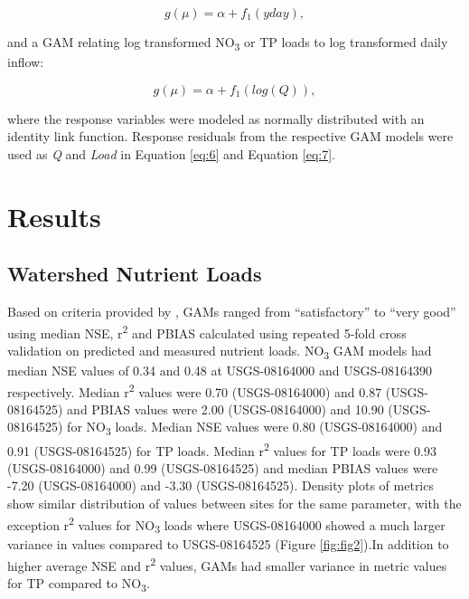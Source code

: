 \documentclass[water,article,submit,oneauthor]{Definitions/mdpi}
\begin{document}
\begin{equation}\label{eq:8}
g(\mu) = \alpha + f_1(yday),
\end{equation}

and a GAM relating log transformed NO\textsubscript{3} or TP loads to
log transformed daily inflow:

\begin{equation}\label{eq:9}
g(\mu) = \alpha + f_1(log(Q)),
\end{equation}

where the response variables were modeled as normally distributed with
an identity link function. Response residuals from the respective GAM
models were used as \emph{Q} and \emph{Load} in Equation \ref{eq:6} and
Equation \ref{eq:7}.

\hypertarget{results}{%
\section{Results}\label{results}}

\hypertarget{watershed-nutrient-loads}{%
\subsection{Watershed Nutrient Loads}\label{watershed-nutrient-loads}}

Based on criteria provided by \citet{moriasiHydrologicWaterQuality2015},
GAMs ranged from ``satisfactory'' to ``very good'' using median NSE,
r\textsuperscript{2} and PBIAS calculated using repeated 5-fold cross
validation on predicted and measured nutrient loads. NO\textsubscript{3}
GAM models had median NSE values of 0.34 and 0.48 at USGS-08164000 and
USGS-08164390 respectively. Median r\textsuperscript{2} values were 0.70
(USGS-08164000) and 0.87 (USGS-08164525) and PBIAS values were 2.00
(USGS-08164000) and 10.90 (USGS-08164525) for NO\textsubscript{3} loads.
Median NSE values were 0.80 (USGS-08164000) and 0.91 (USGS-08164525) for
TP loads. Median r\textsuperscript{2} values for TP loads were 0.93
(USGS-08164000) and 0.99 (USGS-08164525) and median PBIAS values were
-7.20 (USGS-08164000) and -3.30 (USGS-08164525). Density plots of
metrics show similar distribution of values between sites for the same
parameter, with the exception r\textsuperscript{2} values for
NO\textsubscript{3} loads where USGS-08164000 showed a much larger
variance in values compared to USGS-08164525 (Figure \ref{fig:fig2}).In
addition to higher average NSE and r\textsuperscript{2} values, GAMs had
smaller variance in metric values for TP compared to
NO\textsubscript{3}.
\end{document}
